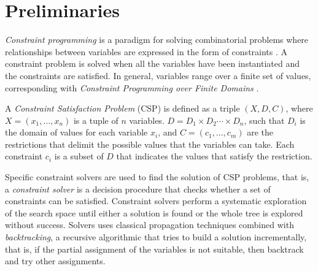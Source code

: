 

\section{Preliminaries}\label{sec3}



\textit{Constraint programming} is a paradigm for solving combinatorial problems where relationships between variables are expressed in the form of constraints \citep{rbw06}.
A constraint problem is solved when all the variables have been instantiated and the constraints are satisfied. In general, variables range over a finite set of values, corresponding with \textit{Constraint Programming over Finite Domains} \cite{schulte2006finite}.


\begin{definition}
  A \textit{Constraint Satisfaction Problem}
  \citep{guns2017miningzinc} (CSP) is defined as a triple
  $( X, D, C)$, where $X=(x_{1},\dots ,x_{n})$ is a tuple of $n$
  variables.  $D=D_{1}\times D_{2}\cdots \times D_{n}$, such that
  $D_i$ is the domain of values for each variable $x_i$, and
  $C=(c_{1},\dots ,c_{m})$ are the restrictions that delimit the
  possible values that the variables can take.  Each constraint
  $c_{i}$ is a subset of $D$ that indicates the values that satisfy
  the restriction.
\end{definition}



Specific constraint solvers are used to find the solution of CSP problems, that is, a \textit{constraint solver} is a decision procedure that checks whether a set of constraints can be satisfied.
Constraint solvers perform a systematic exploration of the search space until either a solution is found or the whole tree is explored without success.
%
Solvers uses classical propagation techniques \citep{van89} combined with {\em backtracking},
a recursive algorithmic that tries to build a solution incrementally, that is, if the partial assignment of the variables is not suitable, then backtrack and try other assignments.


